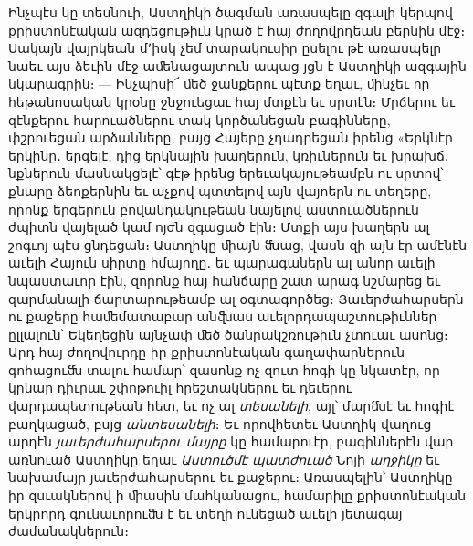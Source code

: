 \documentclass{article}
\begin{document}
{Ինչպէս կը տեսնուի, Աստղիկի ծագման առասպելը զգալի կերպով քրիստոնէական ազդեցութիւն կրած է հայ ժողովրդեան բերնին մէջ։ Սակայն վայրկեան մ՚իսկ չեմ տարակուսիր ըսելու թէ առասպելր նաեւ այս ձեւին մէջ աﬔնացայտուն ապաց յցն է Աստղիկի ազգային նկարագրին։ — Ինչպիսի՜ ﬔծ ջանքերու պէտք եղաւ, ﬕնչեւ որ հեթանոսական կրօնը ջնջուեցաւ հայ մտքէն եւ սրտէն։ Մրճերու եւ զէնքերու հարուածներու տակ կործանեցան բագինները, փշրուեցան արձանները, բայց Հայերը չդադրեցան իրենց «Երկնէր երկինը․ երգելէ, դից երկնային խաղերուն, կռիւներուն եւ խրախճ․ նքներուն մասնակցելէ՝ գէթ իրենց երեւակայութեամբն ու սրտով՝ քնարը ձեոքերնին եւ աչքով պտտելով այն վայոերն ու տեղերը, որոնք երգերուն բովանդակութեան նայելով աստուածներուն ժպիտն վայելած կամ ոյժն զգացած էին։ Մտքի այս խաղերն ալ շոգւոյ պէս ցնդեցան։ Աստղիկը ﬕայն ﬓաց, վասն զի այն էր ամէնէն աւելի Հայուն սիրտը հմայողը․ եւ պարագաներն ալ անոր աւելի նպաստաւոր էին, զորոնք հայ հանճարը շատ արագ նշմարեց եւ զարմանալի ճարտարութեամբ ալ օգտագործեց։ Յաւերժահարսերն ու քաջերը հաﬔմատաբար անﬖաս աւելորդապաշտութիւններ ըլլալուն՝ Եկեղեցին այնչափ ﬔծ ծանրակշռութիւն չտուաւ ասոնց։ Արդ հայ ժողովուրդը իր քրիստոնէական գաղափարներուն գոհացուﬓ տալու համար՝ զասոնք ոչ զուտ հոգի կը նկատէր, որ կրնար դիւրաւ շփոթուիլ հրեշտակներու եւ դեւերու վարդապետութեան հետ, եւ ոչ ալ \emph{տեսանելի}, այլ՝ մարﬓէ եւ հոգիէ բաղկացած, բսյց \emph{անտեսանելի}։ Եւ որովհետեւ Աստղիկ վաղուց արդէն \emph{յաւերժահարսերու մայրը} կը համարուէր, բագիններէն վար առնուած Աստղիկը եղաւ \emph{Աստուծմէ պատժուած} Նոյի \emph{աղջիկը} եւ նախամայր յաւերժահարսերու եւ քաջերու։ Առասպելին՝ Աստղիկը իր զսւակներով ի ﬕասին մահկանացու, համարիլը քրիստոնէական երկրորդ գունաւորուﬓ է եւ տեղի ունեցած աւելի յետագայ ժամանակներուն։

}
\end{document}
